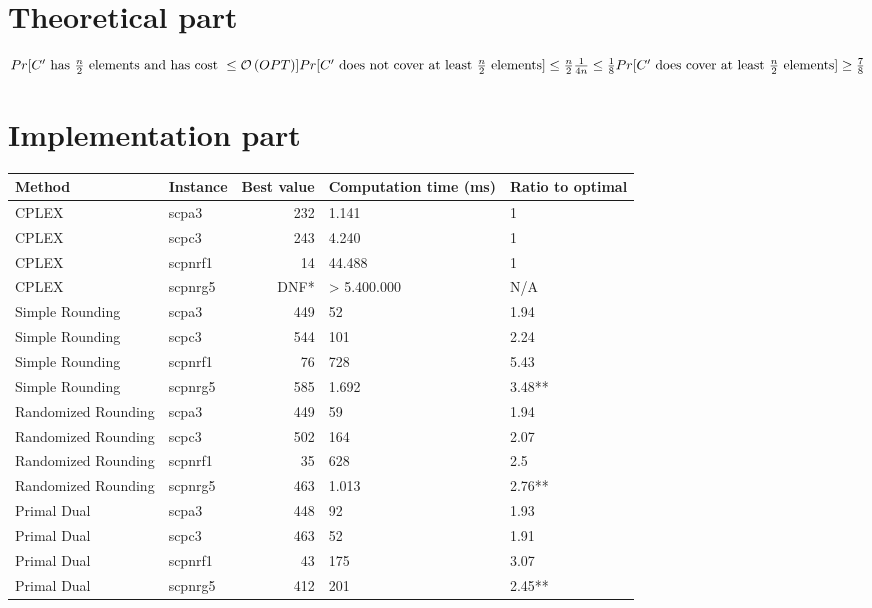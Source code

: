 \section{Theoretical part}
\begin{math}
Pr[C'\text{ has } \frac{n}{2} \text{ elements and has cost } \leq \mathcal{O}\left(OPT\right)]\\
\\
Pr[C' \text{ does not cover at least } \frac{n}{2} \text{ elements}] \leq \frac{n}{2} \frac{1}{4n} \leq \frac{1}{8}\\
\\
Pr[C' \text{ does cover at least } \frac{n}{2} \text{ elements}] \geq \frac{7}{8}
\end{math}

\section{Implementation part}
\begin{table}[H]
	\begin{tabularx}{\linewidth}{|X|l|r|X|X|}
		\hline
		\textbf{Method} & \textbf{Instance} & \textbf{Best value} & \textbf{Computation time (ms)} & \textbf{Ratio to optimal}\\\hline
		CPLEX & scpa3 & 232 & 1.141 & 1\\\hline
		CPLEX & scpc3 & 243 & 4.240 & 1\\\hline
		CPLEX & scpnrf1 & 14 & 44.488 & 1\\\hline
		CPLEX & scpnrg5 & DNF* & > 5.400.000 & N/A\\\hline\hline
		Simple Rounding & scpa3 & 449 & 52 & 1.94\\\hline
		Simple Rounding & scpc3 & 544 & 101 & 2.24\\\hline
		Simple Rounding & scpnrf1 & 76 & 728 & 5.43\\\hline
		Simple Rounding & scpnrg5 & 585 & 1.692 & 3.48**\\\hline\hline
		Randomized Rounding & scpa3 & 449 & 59 & 1.94\\\hline
		Randomized Rounding & scpc3 & 502 & 164 & 2.07\\\hline
		Randomized Rounding & scpnrf1 & 35 & 628 & 2.5\\\hline
		Randomized Rounding & scpnrg5 & 463 & 1.013 & 2.76**\\\hline\hline
		Primal Dual & scpa3 & 448 & 92 & 1.93\\\hline
		Primal Dual & scpc3 & 463 & 52 & 1.91\\\hline
		Primal Dual & scpnrf1 & 43 & 175 & 3.07\\\hline
		Primal Dual & scpnrg5 & 412 & 201 & 2.45**\\\hline
	\end{tabularx}
\end{table}

